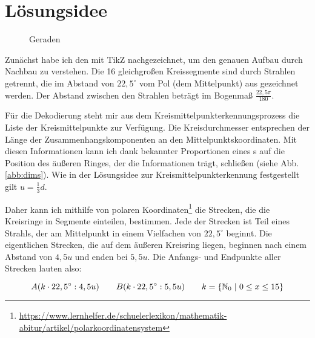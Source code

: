 \section{Lösungsidee}
	\begin{wrapfigure}{r}{0.35\textwidth}
		\setlength\intextsep{0pt}
		\centering
		
		\caption{Geraden}
		\label{abb:spidergrafik}
		\vspace{-20pt}
	\end{wrapfigure}
	Zunächst habe ich den \task{} mit TikZ nachgezeichnet, um den genauen Aufbau durch Nachbau zu verstehen. Die 16 gleichgroßen Kreissegmente sind durch Strahlen getrennt, die im Abstand von \(22,5^{\circ}\) vom Pol (dem Mittelpunkt) aus gezeichnet werden. Der Abstand zwischen den Strahlen beträgt im Bogenmaß \(\frac{22,5\pi}{180}\).

	Für die Dekodierung steht mir aus dem Kreismittelpunkterkennungsprozess die Liste der Kreismittelpunkte zur Verfügung. Die Kreisdurchmesser entsprechen der Länge der Zusammenhangskomponenten an den Mittelpunktskoordinaten. Mit diesen Informationen kann ich dank bekannter Proportionen eines \task{}s auf die Position des äußeren Ringes, der die Informationen trägt, schließen (siehe Abb. \ref{abb:dims}). Wie in der Lösungsidee zur Kreismittelpunkterkennung festgestellt gilt \(u=\frac{1}{3}d\).

	\begin{wrapfigure}{r}{0.25\textwidth}
		\setlength\intextsep{0pt}
		\centering	
		
		\caption{}
		\label{abb:trigon}
	\end{wrapfigure}
	Daher kann ich mithilfe von polaren Koordinaten\footnote{\url{https://www.lernhelfer.de/schuelerlexikon/mathematik-abitur/artikel/polarkoordinatensystem}} die Strecken, die die Kreisringe in Segmente einteilen, bestimmen. Jede der Strecken ist Teil eines Strahls, der am Mittelpunkt in einem Vielfachen von \(22,5^{\circ}\) beginnt. Die eigentlichen Strecken, die auf dem äußeren Kreisring liegen, beginnen nach einem Abstand von \(4,5u\) und enden bei \(5,5u\). Die Anfangs- und Endpunkte aller Strecken lauten also:

	\begin{displaymath}
	A(k \cdot 22,5^{\circ}:4,5u) \hspace{2em} B(k \cdot 22,5^{\circ}:5,5u) \hspace{2em} k = \{\mathbb{N}_0 \hspace{0.3em}|\hspace{0.3em} 0 \le x \le 15\}
	\end{displaymath}

